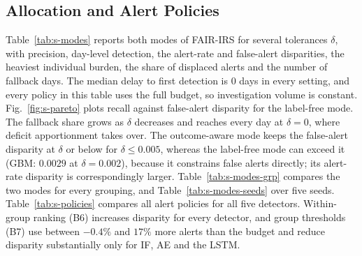 \documentclass[10pt,onecolumn,letterpaper]{article}
\begin{document}
\subsection{Allocation and Alert Policies}
Table~\ref{tab:s-modes} reports both modes of FAIR-IRS for several tolerances $\delta$, with precision, day-level detection, the alert-rate and false-alert disparities, the heaviest individual burden, the share of displaced alerts and the number of fallback days. The median delay to first detection is $0$ days in every setting, and every policy in this table uses the full budget, so investigation volume is constant. Fig.~\ref{fig:s-pareto} plots recall against false-alert disparity for the label-free mode. The fallback share grows as $\delta$ decreases and reaches every day at $\delta=0$, where deficit apportionment takes over. The outcome-aware mode keeps the false-alert disparity at $\delta$ or below for $\delta\le0.005$, whereas the label-free mode can exceed it (GBM: $0.0029$ at $\delta=0.002$), because it constrains false alerts directly; its alert-rate disparity is correspondingly larger. Table~\ref{tab:s-modes-grp} compares the two modes for every grouping, and Table~\ref{tab:s-modes-seeds} over five seeds. Table~\ref{tab:s-policies} compares all alert policies for all five detectors. Within-group ranking (B6) increases disparity for every detector, and group thresholds (B7) use between $-0.4\%$ and $17\%$ more alerts than the budget and reduce disparity substantially only for IF, AE and the LSTM.
\end{document}
